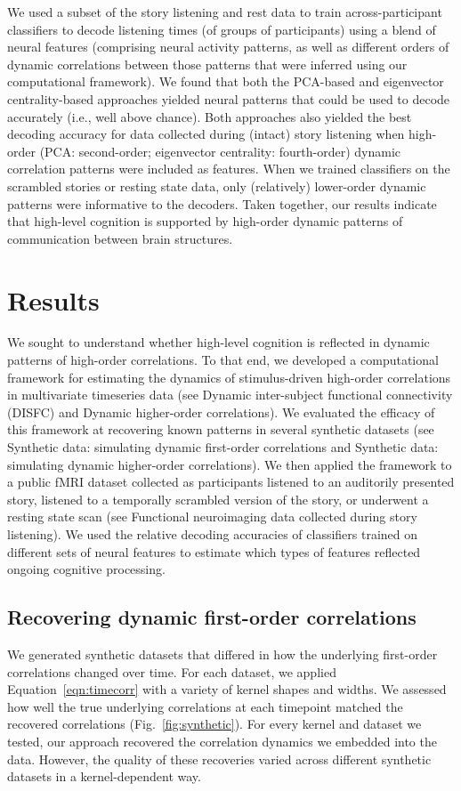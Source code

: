 \documentclass[english]{article}
\begin{document}
We used a subset of the story listening and rest data to train
across-participant classifiers to decode listening times (of groups of
participants) using a blend of neural features (comprising neural
activity patterns, as well as different orders of dynamic correlations
between those patterns that were inferred using our computational
framework).  We found that both the PCA-based and eigenvector
centrality-based approaches yielded neural patterns that could be used
to decode accurately (i.e., well above chance).  Both approaches also
yielded the best decoding accuracy for data collected during (intact)
story listening when high-order (PCA: second-order; eigenvector
centrality: fourth-order) dynamic correlation patterns were included
as features.  When we trained classifiers on the scrambled stories or
resting state data, only (relatively) lower-order dynamic patterns
were informative to the decoders.  Taken together, our results
indicate that high-level cognition is supported by high-order dynamic
patterns of communication between brain structures.




\section*{Results}
We sought to understand whether high-level cognition is reflected in
dynamic patterns of high-order correlations.  To that end, we
developed a computational framework for estimating the dynamics of
stimulus-driven high-order correlations in multivariate timeseries
data (see Dynamic inter-subject functional connectivity
  (DISFC) and Dynamic higher-order correlations).  We
evaluated the efficacy of this framework at recovering known patterns
in several synthetic datasets (see Synthetic data: simulating
  dynamic first-order correlations and Synthetic data:
  simulating dynamic higher-order correlations).  We then
applied the framework to a public fMRI dataset collected as
participants listened to an auditorily presented story, listened to a
temporally scrambled version of the story, or underwent a resting
state scan (see Functional neuroimaging data collected during
  story listening).  We used the relative decoding accuracies of
classifiers trained on different sets of neural features to estimate
which types of features reflected ongoing cognitive processing.


\subsection*{Recovering dynamic first-order correlations}
We generated synthetic datasets that differed in how the underlying first-order
correlations changed over time.  For each dataset, we applied
Equation~\ref{eqn:timecorr} with a variety of kernel shapes and
widths.  We assessed how well the true underlying correlations at each
timepoint matched the recovered correlations
(Fig.~\ref{fig:synthetic}).  For every kernel and dataset we tested,
our approach recovered the correlation dynamics we embedded into the
data.  However, the quality of these recoveries varied across
different synthetic datasets in a kernel-dependent way.
\end{document}
